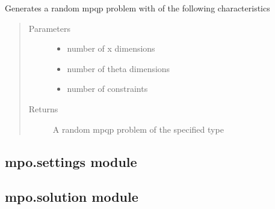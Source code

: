 \documentclass[letterpaper,10pt,english]{sphinxmanual}
\begin{document}
\begin{fulllineitems}
\label{\detokenize{mpo:mpo.problem_generator.generate_mpqp}}
\sphinxAtStartPar
Generates a random mpqp problem with of the following characteristics
\begin{quote}\begin{description}
\item[{Parameters}] \leavevmode\begin{itemize}
\item {} 
\sphinxAtStartPar
{} \textendash{} number of x dimensions

\item {} 
\sphinxAtStartPar
{} \textendash{} number of theta dimensions

\item {} 
\sphinxAtStartPar
{} \textendash{} number of constraints

\end{itemize}

\item[{Returns}] \leavevmode
\sphinxAtStartPar
A random mpqp problem of the specified type

\end{description}\end{quote}

\end{fulllineitems}



\subsection{mpo.settings module}
\label{\detokenize{mpo:module-mpo.settings}}\label{\detokenize{mpo:mpo-settings-module}}

\subsection{mpo.solution module}
\label{\detokenize{mpo:module-mpo.solution}}\label{\detokenize{mpo:mpo-solution-module}}
\end{document}
